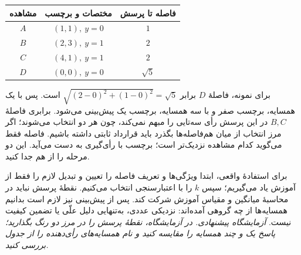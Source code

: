 \begin{tabular}{ccc}
\toprule مشاهده & مختصات و برچسب & فاصله تا پرسش\\\midrule
$A$ & $(1,1),\ y=0$ & $1$\\
$B$ & $(2,3),\ y=1$ & $2$\\
$C$ & $(4,1),\ y=1$ & $2$\\
$D$ & $(0,0),\ y=0$ & $\sqrt5$\\\bottomrule
\end{tabular}

برای نمونه، فاصلهٔ $D$ برابر $\sqrt{(2-0)^2+(1-0)^2}=\sqrt5$ است. پس با یک همسایه، برچسب صفر و با سه همسایه، برچسب یک پیش‌بینی می‌شود. برابری فاصلهٔ $B,C$ در این پرسش رأی سه‌تایی را مبهم نمی‌کند، چون هر دو انتخاب می‌شوند؛ اگر مرز انتخاب از میان هم‌فاصله‌ها بگذرد باید قرارداد ثابتی داشته باشیم. فاصله فقط می‌گوید کدام مشاهده نزدیک‌تر است؛ برچسب با رأی‌گیری به دست می‌آید. این دو مرحله را از هم جدا کنید.

برای استفادهٔ واقعی، ابتدا ویژگی‌ها و تعریف فاصله را تعیین و تبدیل لازم را فقط از آموزش یاد می‌گیریم؛ سپس $k$ را با اعتبارسنجی انتخاب می‌کنیم. نقطهٔ پرسش نباید در محاسبهٔ میانگین و مقیاس آموزش شرکت کند. پس از پیش‌بینی نیز لازم است بدانیم همسایه‌ها از چه گروهی آمده‌اند: نزدیکی عددی، به‌تنهایی دلیل علّی یا تضمین کیفیت نیست.
\textit{آزمایشگاه پیشنهادی. در آزمایشگاه، نقطهٔ پرسش را در مرز دو رنگ بگذارید؛ پاسخ یک و چند همسایه را مقایسه کنید و نام همسایه‌های رأی‌دهنده را از جدول بررسی کنید.}\par 

